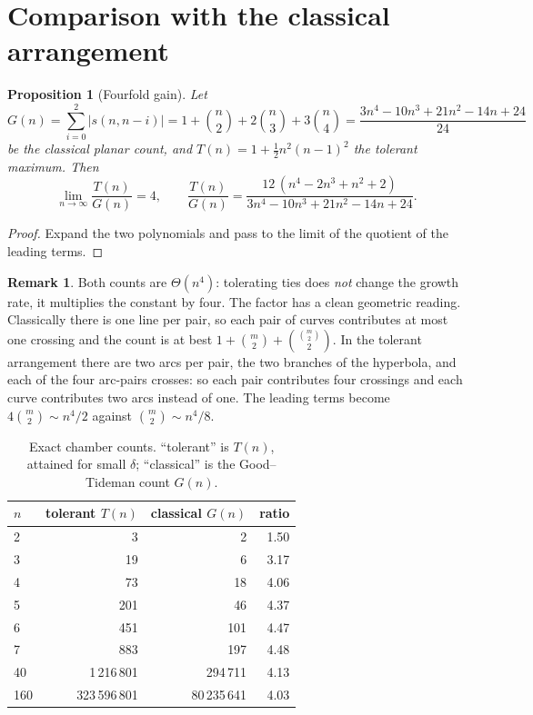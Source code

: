 ﻿\documentclass[11pt,a4paper]{article}
\newtheorem{proposition}[theorem]{Proposition}
\theoremstyle{definition}
\newtheorem{remark}[theorem]{Remark}
\theoremstyle{remark}
\begin{document}
\section{Comparison with the classical arrangement}
\label{sec:compare}

\begin{proposition}[Fourfold gain]\label{prop:ratio}
Let
\[
G(n)=\sum_{i=0}^{2}|s(n,n-i)|=1+\binom n2+2\binom n3+3\binom n4
=\frac{3n^{4}-10n^{3}+21n^{2}-14n+24}{24}
\]
be the classical planar count, and $T(n)=1+\tfrac12 n^2(n-1)^2$ the tolerant
maximum.  Then
\[
\lim_{n\to\infty}\frac{T(n)}{G(n)}=4,
\qquad
\frac{T(n)}{G(n)}
=\frac{12\,(n^{4}-2n^{3}+n^{2}+2)}{3n^{4}-10n^{3}+21n^{2}-14n+24}.
\]
\end{proposition}
\begin{proof}
Expand the two polynomials and pass to the limit of the quotient of the leading
terms.
\end{proof}

\begin{remark}\label{rem:four}
Both counts are $\Theta(n^{4})$: tolerating ties does \emph{not} change the
growth rate, it multiplies the constant by four.  The factor has a clean
geometric reading.  Classically there is one line per pair, so each pair of
curves contributes at most one crossing and the count is at best
$1+\binom m2+\binom{\binom m2}{2}$.  In the tolerant arrangement there are two
arcs per pair, the two branches of the hyperbola, and each of the four arc-pairs
crosses: so each pair contributes four crossings and each curve contributes two
arcs instead of one.  The leading terms become $4\binom m2\sim n^4/2$ against
$\binom m2\sim n^4/8$.
\end{remark}

\begin{table}[t]
\centering
\caption{Exact chamber counts.  ``tolerant'' is $T(n)$, attained for small
$\delta$; ``classical'' is the Good--Tideman count $G(n)$.}
\label{tab:counts}
\begin{tabular}{l r r r}
\toprule
$n$ & tolerant $T(n)$ & classical $G(n)$ & ratio \\
\midrule
2 & 3 & 2 & 1.50 \\
3 & 19 & 6 & 3.17 \\
4 & 73 & 18 & 4.06 \\
5 & 201 & 46 & 4.37 \\
6 & 451 & 101 & 4.47 \\
7 & 883 & 197 & 4.48 \\
\midrule
40 & 1\,216\,801 & 294\,711 & 4.13 \\
160 & 323\,596\,801 & 80\,235\,641 & 4.03 \\
\bottomrule
\end{tabular}
\end{table}
\end{document}
